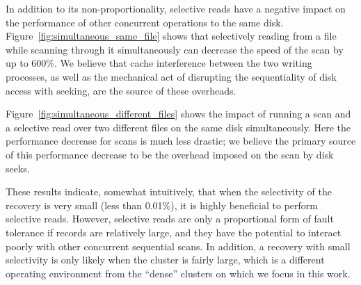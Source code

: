 In addition to its non-proportionality, selective reads have a negative impact
on the performance of other concurrent operations to the same
disk. Figure~\ref{fig:simultaneous_same_file} shows that selectively reading
from a file while scanning through it simultaneously can decrease the speed of
the scan by up to 600\%. We believe that cache interference between the two
writing processes, as well as the mechanical act of disrupting the sequentiality
of disk access with seeking, are the source of these overheads.

Figure~\ref{fig:simultaneous_different_files} shows the impact of running a
scan and a selective read over two different files on the same disk
simultaneously. Here the performance decrease for scans is much less drastic;
we believe the primary source of this performance decrease to be the overhead
imposed on the scan by disk seeks.

These results indicate, somewhat intuitively, that when the selectivity of the
recovery is very small (less than 0.01\%), it is highly beneficial to perform
selective reads. However, selective reads are only a proportional form of fault
tolerance if records are relatively large, and they have the potential to
interact poorly with other concurrent sequential scans. In addition, a recovery
with small selectivity is only likely when the cluster is fairly large, which
is a different operating environment from the ``dense'' clusters on which we
focus in this work.
